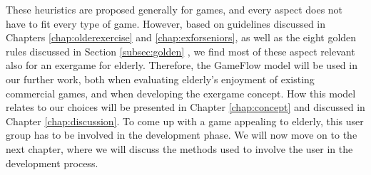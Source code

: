 These heuristics are proposed generally for games, and every aspect does not have to fit every type of game. However, based on guidelines discussed in Chapters \ref{chap:olderexercise} and \ref{chap:exforseniors}, as well as the eight golden rules discussed in Section \ref{subsec:golden} , we find most of these aspect relevant also for an exergame for elderly. Therefore, the GameFlow model will be used in our further work, both when evaluating elderly's enjoyment of existing commercial games, and when developing the exergame concept. How this model relates to our choices will be presented in Chapter \ref{chap:concept} and discussed in Chapter \ref{chap:discussion}. To come up with a game appealing to elderly, this user group has to be involved in the development phase. We will now move on to the next chapter, where we will discuss the methods used to involve the user in the development process.
